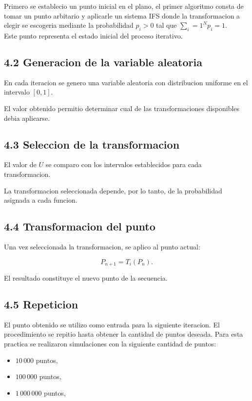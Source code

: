 \documentclass[12pt,a4paper]{article}
\begin{document}
Primero se establecio un punto inicial en el plano, el primer algoritmo consta de tomar un punto arbitario y aplicarle un sistema IFS donde la transformacion a elegir se escogeria mediante la probabilidad $p_i > 0$ tal que $\sum_{i} = 1^N p_i = 1$. \\

Este punto representa el estado inicial del proceso iterativo.
 
\subsection*{4.2 Generacion de la variable aleatoria}

En cada iteracion se genero una variable aleatoria con distribucion uniforme en el intervalo $[0,1]$.

El valor obtenido permitio determinar cual de las transformaciones disponibles debia aplicarse.

\subsection*{4.3 Seleccion de la transformacion}

El valor de $U$ se comparo con los intervalos establecidos para cada transformacion.

La transformacion seleccionada depende, por lo tanto, de la probabilidad asignada a cada funcion.
\newpage
\subsection*{4.4 Transformacion del punto}

Una vez seleccionada la transformacion, se aplico al punto actual:

\begin{equation}
    P_{n+1}=T_i(P_n).
\end{equation}

El resultado constituye el nuevo punto de la secuencia.

\subsection*{4.5 Repeticion}

El punto obtenido se utilizo como entrada para la siguiente iteracion.
El procedimiento se repitio hasta obtener la cantidad de puntos deseada.
Para esta practica se realizaron simulaciones con la siguiente cantidad de puntos:
\begin{itemize}
    \item $10\,000$ puntos,
    \item $100\,000$ puntos,
    \item $1\,000\,000$ puntos,
\end{itemize}
\end{document}
